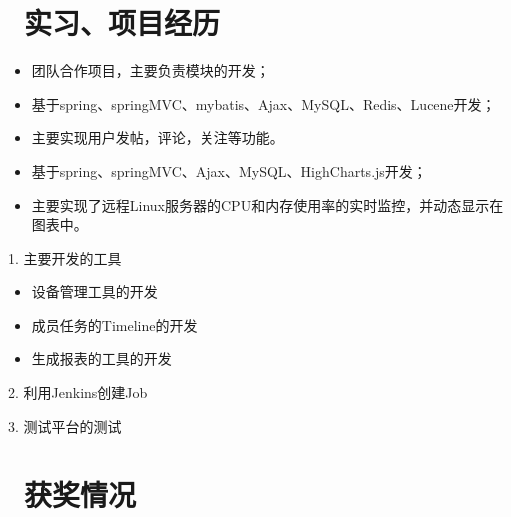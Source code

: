 \documentclass{resume}
\begin{document}
\section{\faUsers\ 实习、项目经历}
\begin{itemize}[parsep=0.5ex]
\item 团队合作项目，主要负责模块的开发；
\item 基于spring、springMVC、mybatis、Ajax、MySQL、Redis、Lucene开发；
\item 主要实现用户发帖，评论，关注等功能。
\end{itemize}
\begin{itemize}[parsep=0.5ex]
\item 基于spring、springMVC、Ajax、MySQL、HighCharts.js开发；
\item 主要实现了远程Linux服务器的CPU和内存使用率的实时监控，并动态显示在图表中。
\end{itemize}
1. 主要开发的工具
\begin{itemize}[parsep=0.5ex]
\item 设备管理工具的开发
\item 成员任务的Timeline的开发
\item 生成报表的工具的开发
\end{itemize}
2. 利用Jenkins创建Job  

3. 测试平台的测试





\section{\faHeartO\ 获奖情况}
\begin{itemize}[parsep=0.5ex]

\end{itemize}
\end{document}
